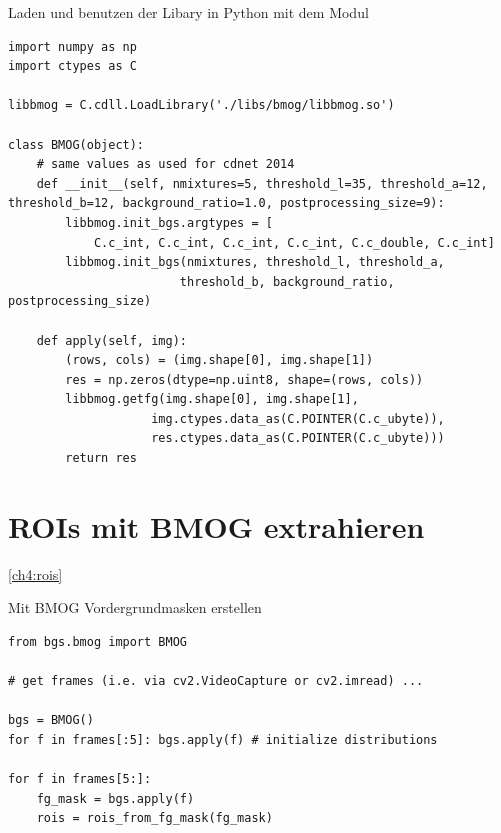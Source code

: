 \begin{code}
\caption{Laden und benutzen der Libary in Python mit dem Modul  }
\begin{verbatim}
import numpy as np
import ctypes as C

libbmog = C.cdll.LoadLibrary('./libs/bmog/libbmog.so')

class BMOG(object):
	# same values as used for cdnet 2014
    def __init__(self, nmixtures=5, threshold_l=35, threshold_a=12, threshold_b=12, background_ratio=1.0, postprocessing_size=9):
        libbmog.init_bgs.argtypes = [
            C.c_int, C.c_int, C.c_int, C.c_int, C.c_double, C.c_int]
        libbmog.init_bgs(nmixtures, threshold_l, threshold_a,
                        threshold_b, background_ratio, postprocessing_size)

    def apply(self, img):
        (rows, cols) = (img.shape[0], img.shape[1])
        res = np.zeros(dtype=np.uint8, shape=(rows, cols))
        libbmog.getfg(img.shape[0], img.shape[1],
                    img.ctypes.data_as(C.POINTER(C.c_ubyte)),
                    res.ctypes.data_as(C.POINTER(C.c_ubyte)))
        return res
\end{verbatim}
\end{code}

\section{ROIs mit BMOG extrahieren} \label{ap:bmog_roi}
\autoref{ch4:rois}

\begin{code}
\caption{Mit BMOG Vordergrundmasken erstellen }
\label{code:fg_mask}
\begin{verbatim}
from bgs.bmog import BMOG

# get frames (i.e. via cv2.VideoCapture or cv2.imread) ...

bgs = BMOG()
for f in frames[:5]: bgs.apply(f) # initialize distributions

for f in frames[5:]:
    fg_mask = bgs.apply(f)
    rois = rois_from_fg_mask(fg_mask)
\end{verbatim}
\end{code}

